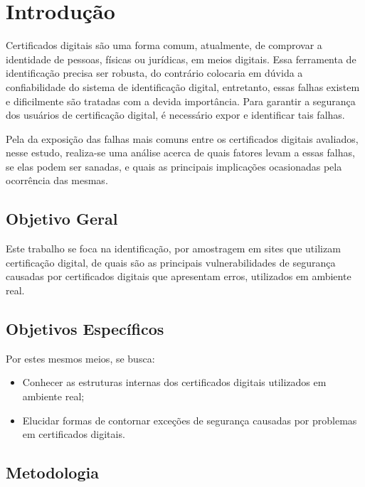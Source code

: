 
\chapter[Introdução]{Introdução}
	Certificados digitais são uma forma comum, atualmente, de comprovar a identidade de pessoas, físicas ou jurídicas, em meios digitais. Essa ferramenta de identificação precisa ser robusta, do contrário colocaria em dúvida a confiabilidade do sistema de identificação digital, entretanto, essas falhas existem e dificilmente são tratadas com a devida importância. Para garantir a segurança dos usuários de certificação digital, é necessário expor e identificar tais falhas.

	Pela da exposição das falhas mais comuns entre os certificados digitais avaliados, nesse estudo, realiza-se uma análise acerca de quais fatores levam a essas falhas, se elas podem ser sanadas, e quais as principais implicações ocasionadas pela ocorrência das mesmas.

\section[Objetivo Geral]{Objetivo Geral}

	Este trabalho se foca na identificação, por amostragem em sites que utilizam certificação digital, de quais são as principais vulnerabilidades de segurança causadas por certificados digitais que apresentam erros, utilizados em ambiente real.

\section[Objetivos Específicos]{Objetivos Específicos}

	Por estes mesmos meios, se busca:
	\begin{itemize}
		\item Conhecer as estruturas internas dos certificados digitais utilizados em ambiente real; 
		\item Elucidar formas de contornar exceções de segurança causadas por problemas em certificados digitais.
	\end{itemize}

\section[Metodologia]{Metodologia}
	
